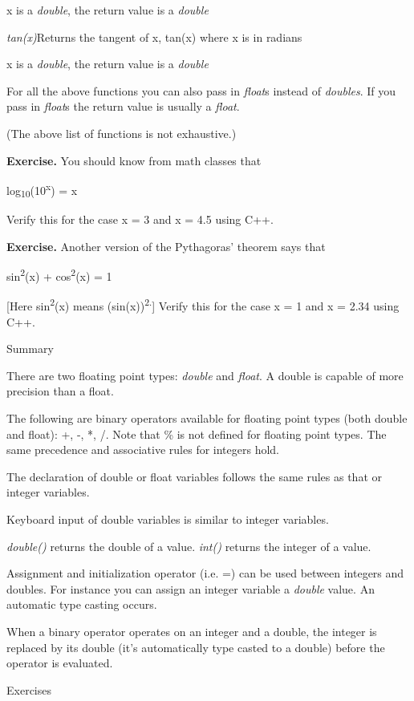 \documentclass[
]{article}
\begin{document}
x is a \emph{double}, the return value is a \emph{double}

\emph{tan(x)}Returns the tangent of x, tan(x) where x is in radians

x is a \emph{double}, the return value is a \emph{double}

For all the above functions you can also pass in \emph{float}s instead
of \emph{doubles}. If you pass in \emph{float}s the return value is
usually a \emph{float}.

(The above list of functions is not exhaustive.)

\textbf{Exercise.} You should know from math classes that

log\textsubscript{10}(10\textsuperscript{x}) = x

Verify this for the case x = 3 and x = 4.5 using C++.

\textbf{Exercise.} Another version of the Pythagoras' theorem says that

sin\textsuperscript{2}(x) + cos\textsuperscript{2}(x) = 1

{[}Here sin\textsuperscript{2}(x) means (sin(x))\textsuperscript{2.}{]}
Verify this for the case x = 1 and x = 2.34 using C++.

Summary

There are two floating point types: \emph{double} and \emph{float}. A
double is capable of more precision than a float.

The following are binary operators available for floating point types
(both double and float): +, -, *, /. Note that \% is not defined for
floating point types. The same precedence and associative rules for
integers hold.

The declaration of double or float variables follows the same rules as
that or integer variables.

Keyboard input of double variables is similar to integer variables.

\emph{double()} returns the double of a value. \emph{int()} returns the
integer of a value.

Assignment and initialization operator (i.e. =) can be used between
integers and doubles. For instance you can assign an integer variable a
\emph{double} value. An automatic type casting occurs.

When a binary operator operates on an integer and a double, the integer
is replaced by its double (it's automatically type casted to a double)
before the operator is evaluated.

Exercises\\
\end{document}
